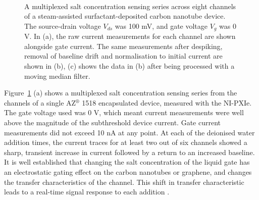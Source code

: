 \documentclass[
  a4paper,
]{scrbook}
\begin{document}
\begin{figure}
\begin{minipage}[t]{0.70\linewidth}
{{}

}

\end{minipage}%
%
\begin{minipage}[t]{0.15\linewidth}

{\centering 

~

}

\end{minipage}%

\caption{\label{fig-salt-conc-sensing}A multiplexed salt concentration
sensing series across eight channels of a steam-assisted
surfactant-deposited carbon nanotube device. The source-drain voltage
\(V_{ds}\) was 100 mV, and gate voltage \(V_g\) was 0 V. In (a), the raw
current measurements for each channel are shown alongside gate current.
The same measurements after despiking, removal of baseline drift and
normalisation to initial current are shown in (b), (c) shows the data in
(b) after being processed with a moving median filter.}

\end{figure}

Figure~\ref{fig-salt-conc-sensing} (a) shows a multiplexed salt
concentration sensing series from the channels of a single
AZ\(^\circledR\) 1518 encapsulated device, measured with the NI-PXIe.
The gate voltage used was 0 V, which meant current measurements were
well above the magnitude of the subthreshold device current. Gate
current measurements did not exceed 10 nA at any point. At each of the
deionised water addition times, the current traces for at least two out
of six channels showed a sharp, transient increase in current followed
by a return to an increased baseline. It is well established that
changing the salt concentration of the liquid gate has an electrostatic
gating effect on the carbon nanotubes or graphene, and changes the
transfer characteristics of the channel. This shift in transfer
characteristic leads to a real-time signal response to each addition
\autocite{Heller2009,Heller2010,Kireev2017}.
\end{document}
